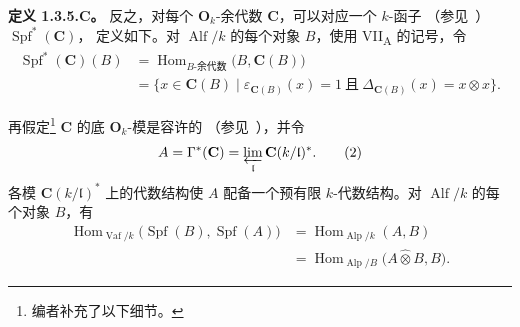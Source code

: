 \medskip
\noindent\textbf{定义 1.3.5.C。}
\label{sga3:VIIB:1.3.5.C}
反之，对每个 \(\mathbf O_k\)-余代数 \(\mathbf C\)，可以对应一个 \(k\)-函子
\textup{（参见\ ）}\(\operatorname{Spf}^*(\mathbf C)\)，
定义如下。对 \(\operatorname{Alf}/k\) 的每个对象 \(B\)，使用
VII\textsubscript{A}  的记号，令
\begin{equation}
\begin{aligned}
  \operatorname{Spf}^*(\mathbf C)(B)
  &=
  \operatorname{Hom}_{B\text{-余代数}}\bigl(B,\mathbf C(B)\bigr)
  \\
  &=
  \bigl\{x\in\mathbf C(B)\mid
    \varepsilon_{\mathbf C(B)}(x)=1
    \ \text{且}\
    \Delta_{\mathbf C(B)}(x)=x\otimes x\bigr\}.
\end{aligned}
\tag{1}
\label{sga3:VIIB:1.3.5.C:1}
\end{equation}

再假定\footnote{\label{sga3:VIIB:nde:61}编者补充了以下细节。}
\(\mathbf C\) 的底 \(\mathbf O_k\)-模是容许的
\textup{（参见\ ）}，并令
\begin{equation}
  A
  =
  \Gamma^*(\mathbf C)
  =
  \varprojlim_{\mathfrak l}\mathbf C(k/\mathfrak l)^*.
\tag{2}
\label{sga3:VIIB:1.3.5.C:2}
\end{equation}
各模 \(\mathbf C(k/\mathfrak l)^*\) 上的代数结构使 \(A\) 配备一个预有限
\(k\)-代数结构。对 \(\operatorname{Alf}/k\) 的每个对象 \(B\)，有
\begin{equation}
\begin{aligned}
  \operatorname{Hom}_{\operatorname{Vaf}/k}
    \bigl(\operatorname{Spf}(B),\operatorname{Spf}(A)\bigr)
  &=
  \operatorname{Hom}_{\operatorname{Alp}/k}(A,B)
  \\
  &=
  \operatorname{Hom}_{\operatorname{Alp}/B}
    \bigl(A\widehat{\otimes}B,B\bigr).
\end{aligned}
\tag{3}
\label{sga3:VIIB:1.3.5.C:3}
\end{equation}

